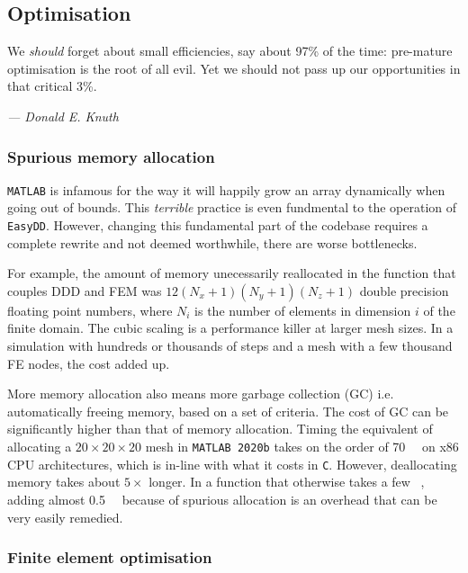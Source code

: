 \subsection{Optimisation}
\renewcommand{\epigraphflush}{flushright}
\renewcommand{\textflush}{flushright}
\setlength{\epigraphwidth}{0.75\linewidth}
\epigraph{We \emph{should} forget about small efficiencies, say about 97\% of the time: pre-mature optimisation is the root of all evil. Yet we should not pass up our opportunities in that critical 3\%.}{\textit{--- Donald E. Knuth \cite[p.~268]{knuth1974structured}}}

\subsubsection{Spurious memory allocation}\label{ss:memAlloc}

\texttt{MATLAB} is infamous for the way it will happily grow an array dynamically when going out of bounds. This \emph{terrible} practice is even fundmental to the operation of \texttt{EasyDD}. However, changing this fundamental part of the codebase requires a complete rewrite and not deemed worthwhile, there are worse bottlenecks.

For example, the amount of memory unecessarily reallocated in the function that couples DDD and FEM was $12(N_x + 1)(N_y + 1)(N_z + 1)$ double precision floating point numbers, where $N_i$ is the number of elements in dimension $i$ of the finite domain. The cubic scaling is a performance killer at larger mesh sizes. In a simulation with hundreds or thousands of steps and a mesh with a few thousand FE nodes, the cost added up.

More memory allocation also means more garbage collection (GC) \cite{hanson1990fast} i.e. automatically freeing memory, based on a set of criteria. The cost of GC can be significantly higher than that of memory allocation. Timing the equivalent of allocating a $20 \times 20 \times 20$ mesh in \texttt{MATLAB 2020b} takes on the order of \SI{70}{\micro\sec} on x86 CPU architectures, which is in-line with what it costs in \texttt{C}. However, deallocating memory takes about $5 \times$ longer. In a function that otherwise takes a few \si{\milli\sec}, adding almost \SI{0.5}{\milli\sec} because of spurious allocation is an overhead that can be very easily remedied.

\subsubsection{Finite element optimisation}\label{ss:feOpt}

